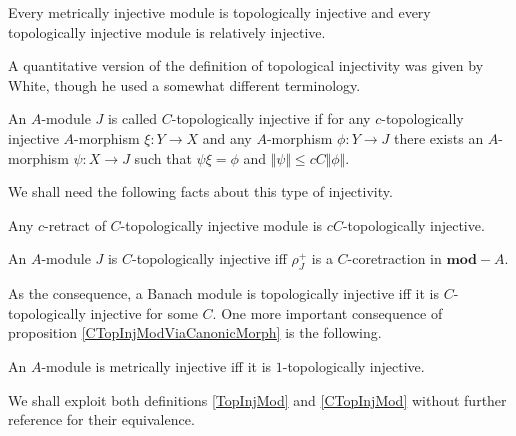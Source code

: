 \begin{proposition}\label{MetInjIsTopInjAndTopInjIsRelInj} Every metrically injective module is topologically injective and every topologically injective module is relatively injective.
\end{proposition}

A quantitative version of the definition of topological injectivity was given by White,  though he used a somewhat different terminology.

\begin{definition}\label{CTopInjMod} An $A$-module $J$ is called  $C$-topologically injective if for any $c$-topologically injective $A$-morphism $\xi:Y\to X$ and any $A$-morphism $\phi:Y\to J$ there exists an $A$-morphism $\psi:X\to J$ such that $\psi\xi=\phi$ and $\Vert\psi\Vert\leq c C\Vert\phi\Vert$.
\end{definition}

We shall need the following facts about this type of injectivity.

\begin{proposition}\label{RetrCTopInjIsCTopInj} Any $c$-retract of $C$-topologically injective module is $cC$-topologically injective.
\end{proposition}

\begin{proposition}\label{CTopInjModViaCanonicMorph} An $A$-module $J$ is $C$-topologically injective iff $\rho_J^+$ is a $C$-coretraction in $\mathbf{mod}-A$.
\end{proposition}

As the consequence, a Banach module is topologically injective iff it is $C$-topologically injective for some $C$. One more important consequence of proposition \ref{CTopInjModViaCanonicMorph} is the following.

\begin{proposition}\label{MetInjIsOneTopInj} An $A$-module is metrically injective iff it is $1$-topologically injective.
\end{proposition}

We shall exploit both definitions \ref{TopInjMod} and \ref{CTopInjMod} without further reference for their equivalence. 

